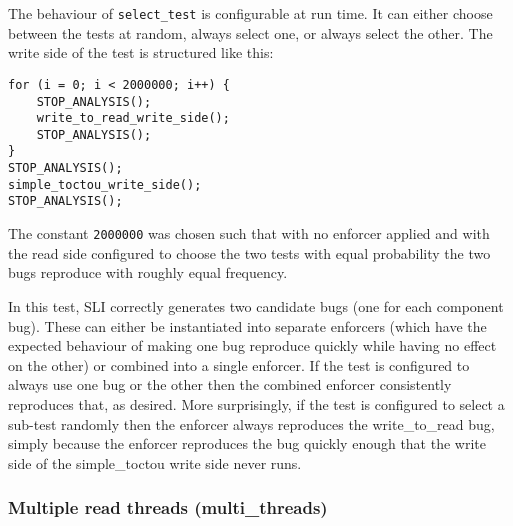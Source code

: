 The behaviour of \verb|select_test| is configurable at run time.  It
can either choose between the tests at random, always select one, or
always select the other.  The write side of the test is structured
like this:

\begin{verbatim}
for (i = 0; i < 2000000; i++) {
    STOP_ANALYSIS();
    write_to_read_write_side();
    STOP_ANALYSIS();
}
STOP_ANALYSIS();
simple_toctou_write_side();
STOP_ANALYSIS();
\end{verbatim}

The constant \verb|2000000| was chosen such that with no enforcer
applied and with the read side configured to choose the two tests with
equal probability the two bugs reproduce with roughly equal frequency.

In this test, SLI correctly generates two candidate bugs (one for each
component bug).  These can either be instantiated into separate
enforcers (which have the expected behaviour of making one bug
reproduce quickly while having no effect on the other) or combined
into a single enforcer.  If the test is configured to always use one
bug or the other then the combined enforcer consistently reproduces
that, as desired.  More surprisingly, if the test is configured to
select a sub-test randomly then the enforcer always reproduces the
write\_to\_read bug, simply because the enforcer reproduces the bug
quickly enough that the write side of the simple\_toctou write side
never runs.

\subsubsection{Multiple read threads (multi\_threads)}


